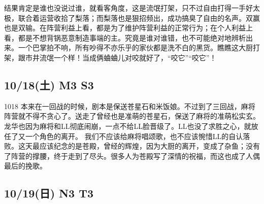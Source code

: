 结果肯定是谁也没说过谁，就看客角度，这是流氓打架，只不过自由打得一手好太极，联合着运营收拾了梨落；而梨落也是狠招频出，成功搞臭了自由的名声。双赢也是双输。在阵营利益上看，都是为了维护阵营利益的正常行为；在个人利益上看，都是不想背锅恶意制造事端的主。究竟是谁对谁错，也不可能绝对地辨析出来。一个巴掌拍不响，所有吵得不亦乐乎的家伙都是洗不白的黑货。瞧瞧这大厨打架，跟市井流氓一个样！当成俩蛐蛐儿对咬就好了，“咬它”“咬它”！

\subsection{10/18(土) M3 S3}


1018 本来在一回战的时候，剧本是保送苍星石和米饭娘。不过到了三回战，麻将阵营就不得不贪心了。送走了曾经也是准萌的苍星石，保送了麻将的准萌松实玄。龙华也因为麻将和LL彻底闹崩，一点不给LL脸晋级了。LL也没了求胜之心，就放任了又一个角色的离开。
我们不应该给麻将唱颂歌，也不应该惋惜LL的自认落败。这天最应该纪念的是苍殿，曾经的辉煌，因为大厨的离开，变成了杂鱼；没有了阵营的撑腰，终于走到了尽头。很多人为苍殿写了深情的祝福，而这也成了人偶最后的挽歌。

\subsection{10/19(日) N3 T3}

